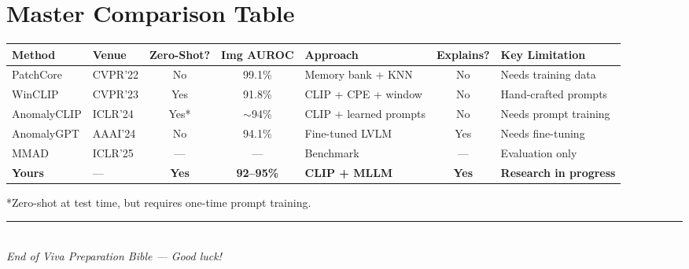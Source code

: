 \documentclass[12pt, a4paper]{article}
\begin{document}

\section{Master Comparison Table}

\begin{table}[h!]
\centering
\renewcommand{\arraystretch}{1.3}
\small
\begin{tabularx}{\textwidth}{@{}p{2cm}p{1.3cm}ccp{2.5cm}cp{2.8cm}@{}}
\toprule
\textbf{Method} & \textbf{Venue} & \textbf{Zero-Shot?} & \textbf{Img AUROC} & \textbf{Approach} & \textbf{Explains?} & \textbf{Key Limitation} \\
\midrule
PatchCore & CVPR'22 & No & 99.1\% & Memory bank + KNN & No & Needs training data \\
WinCLIP & CVPR'23 & Yes & 91.8\% & CLIP + CPE + window & No & Hand-crafted prompts \\
AnomalyCLIP & ICLR'24 & Yes* & $\sim$94\% & CLIP + learned prompts & No & Needs prompt training \\
AnomalyGPT & AAAI'24 & No & 94.1\% & Fine-tuned LVLM & Yes & Needs fine-tuning \\
MMAD & ICLR'25 & --- & --- & Benchmark & --- & Evaluation only \\
\textbf{Yours} & --- & \textbf{Yes} & \textbf{92--95\%} & \textbf{CLIP + MLLM} & \textbf{Yes} & \textbf{Research in progress} \\
\bottomrule
\end{tabularx}
\footnotesize{*Zero-shot at test time, but requires one-time prompt training.}
\end{table}

\vfill
\begin{center}
\rule{0.4\textwidth}{0.5pt}\\[0.3cm]
{\small\textit{End of Viva Preparation Bible --- Good luck!}}
\end{center}
\end{document}
